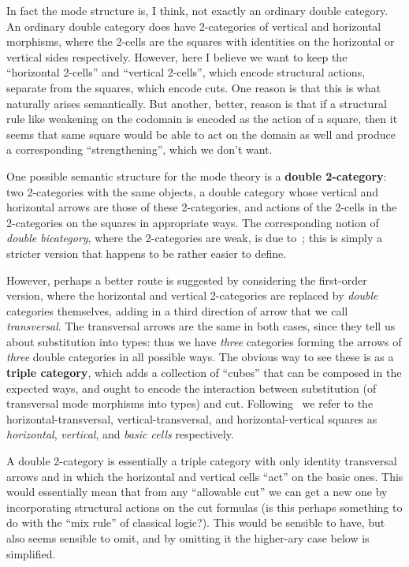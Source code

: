 \documentclass{article}
\theoremstyle{definition}
\theoremstyle{remark}
\begin{document}
In fact the mode structure is, I think, not exactly an ordinary double category.
An ordinary double category does have 2-categories of vertical and horizontal morphisms, where the 2-cells are the squares with identities on the horizontal or vertical sides respectively.
However, here I believe we want to keep the ``horizontal 2-cells'' and ``vertical 2-cells'', which encode structural actions, separate from the squares, which encode cuts.
One reason is that this is what naturally arises semantically.
But another, better, reason is that if a structural rule like weakening on the codomain is encoded as the action of a square, then it seems that same square would be able to act on the domain as well and produce a corresponding ``strengthening'', which we don't want.

One possible semantic structure for the mode theory is a \textbf{double 2-category}: two 2-categories with the same objects, a double category whose vertical and horizontal arrows are those of these 2-categories, and actions of the 2-cells in the 2-categories on the squares in appropriate ways.
The corresponding notion of \emph{double bicategory}, where the 2-categories are weak, is due to~\cite{verity:base-change}; this is simply a stricter version that happens to be rather easier to define.

However, perhaps a better route is suggested by considering the first-order version, where the horizontal and vertical 2-categories are replaced by \emph{double} categories themselves, adding in a third direction of arrow that we call \emph{transversal}.
The transversal arrows are the same in both cases, since they tell us about substitution into types: thus we have \emph{three} categories forming the arrows of \emph{three} double categories in all possible ways.
The obvious way to see these is as a \textbf{triple category}, which adds a collection of ``cubes'' that can be composed in the expected ways, and ought to encode the interaction between substitution (of transversal mode morphisms into types) and cut.
Following~\cite{gp:intercategories-i,gp:intercategories-ii} we refer to the horizontal-transversal, vertical-transversal, and horizontal-vertical squares as \emph{horizontal}, \emph{vertical}, and \emph{basic cells} respectively.

A double 2-category is essentially a triple category with only identity transversal arrows and in which the horizontal and vertical cells ``act'' on the basic ones.
This would essentially mean that from any ``allowable cut'' we can get a new one by incorporating structural actions on the cut formulas (is this perhaps something to do with the ``mix rule'' of classical logic?).
This would be sensible to have, but also seems sensible to omit, and by omitting it the higher-ary case below is simplified.
\end{document}
